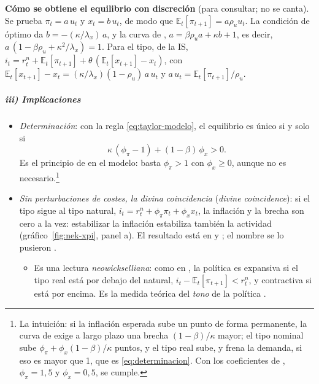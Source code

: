 \documentclass[11pt]{article}
\begin{document}
\begin{anotaciones}
\textbf{Cómo se obtiene el equilibrio con discreción} (para consultar; no se canta). Se prueba $\pi_t=a\,u_t$ y $x_t=b\,u_t$, de modo que $\mathbb{E}_t[\pi_{t+1}]=a\rho_u u_t$. La condición de óptimo da $b=-(\kappa/\lambda_x)\,a$, y la curva de , $a=\beta\rho_u a+\kappa b+1$, es decir, $a\,(1-\beta\rho_u+\kappa^2/\lambda_x)=1$. Para el tipo, de la IS, $i_t=r^n_t+\mathbb{E}_t[\pi_{t+1}]+\theta\,(\mathbb{E}_t[x_{t+1}]-x_t)$, con $\mathbb{E}_t[x_{t+1}]-x_t=(\kappa/\lambda_x)(1-\rho_u)\,a\,u_t$ y $a\,u_t=\mathbb{E}_t[\pi_{t+1}]/\rho_u$\nocite{ClaridaGaliGertler1999Science}.\findemo
\end{anotaciones}

\subparagraph{iii) Implicaciones}

\begin{itemize}
\item \emph{Determinación}: con la regla \eqref{eq:taylor-modelo}, el equilibrio es único si y solo si
  \begin{equation}\label{eq:determinacion}
  \kappa\,(\phi_\pi-1)+(1-\beta)\,\phi_x>0 .
  \end{equation}
  Es el principio de  en el modelo: basta $\phi_\pi>1$ con $\phi_x\geq0$, aunque no es necesario\nocite{Gali2015Monetary}.\footnote{La intuición: si la inflación esperada sube un punto de forma permanente, la curva de  exige a largo plazo una brecha $(1-\beta)/\kappa$ mayor; el tipo nominal sube $\phi_\pi+\phi_x(1-\beta)/\kappa$ puntos, y el tipo real sube, y frena la demanda, si eso es mayor que 1, que es \eqref{eq:determinacion}. Con los coeficientes de , $\phi_\pi=1{,}5$ y $\phi_x=0{,}5$, se cumple.}
\item \emph{Sin perturbaciones de costes, la divina coincidencia} (\emph{divine coincidence}): si el tipo sigue al tipo natural, $i_t=r^n_t+\phi_\pi\pi_t+\phi_x x_t$, la inflación y la brecha son cero a la vez: estabilizar la inflación estabiliza también la actividad (gráfico~\ref{fig:nek-xpi}, panel a). El resultado está en \textcite{GoodfriendKing1997New} y \textcite{RotembergWoodford1997Optimization}; el nombre se lo pusieron \textcite{BlanchardGali2007Real}.
  \begin{itemize}
  \item Es una lectura \emph{neowickselliana}\nocite{Woodford2003Interest}: como en , la política es expansiva si el tipo real está por debajo del natural, $i_t-\mathbb{E}_t[\pi_{t+1}]<r^n_t$, y contractiva si está por encima. Es la medida teórica del \emph{tono} de la política .

\end{itemize}
\end{itemize}
\end{document}
